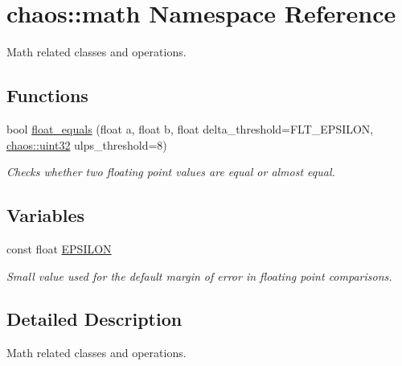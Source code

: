 \hypertarget{namespacechaos_1_1math}{\section{chaos\-:\-:math Namespace Reference}
\label{namespacechaos_1_1math}
}


Math related classes and operations.  


\subsection*{Functions}
\begin{DoxyCompactItemize}
\item 
bool \hyperlink{namespacechaos_1_1math_a45b789648ddacd3e1d2403834c1953a6}{float\-\_\-equals} (float a, float b, float delta\-\_\-threshold=F\-L\-T\-\_\-\-E\-P\-S\-I\-L\-O\-N, \hyperlink{namespacechaos_a8641b3ae4551f0b35570d4f9f4ec22d9}{chaos\-::uint32} ulps\-\_\-threshold=8)
\begin{DoxyCompactList}\small\item\em Checks whether two floating point values are equal or almost equal. \end{DoxyCompactList}\end{DoxyCompactItemize}
\subsection*{Variables}
\begin{DoxyCompactItemize}
\item 
\hypertarget{namespacechaos_1_1math_a592b0721bd50c7f638c5f09d6db661fe}{const float \hyperlink{namespacechaos_1_1math_a592b0721bd50c7f638c5f09d6db661fe}{E\-P\-S\-I\-L\-O\-N}}\label{namespacechaos_1_1math_a592b0721bd50c7f638c5f09d6db661fe}

\begin{DoxyCompactList}\small\item\em Small value used for the default margin of error in floating point comparisons. \end{DoxyCompactList}\end{DoxyCompactItemize}


\subsection{Detailed Description}
Math related classes and operations. 

